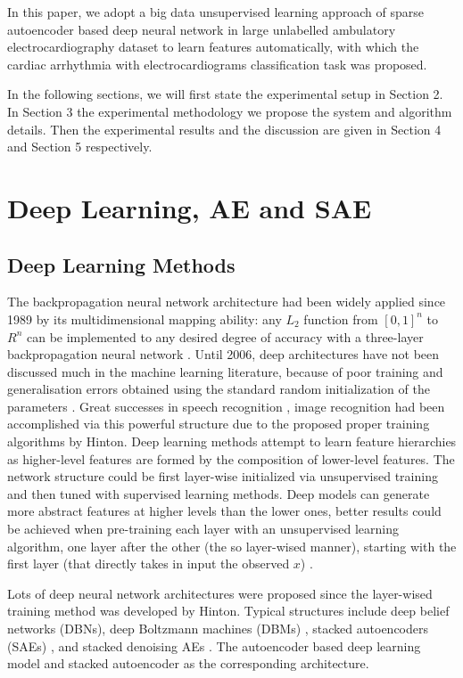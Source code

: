 \documentclass[journal]{IEEEtran}
\begin{document}
In this paper, we adopt a big data unsupervised learning approach of sparse autoencoder based deep neural network in large unlabelled ambulatory electrocardiography dataset to learn features automatically, with which the cardiac arrhythmia with electrocardiograms classification task was proposed. 

In the following sections, we will first state the experimental setup in Section 2. In Section 3 the experimental methodology we propose the system and algorithm details. Then the experimental results and the discussion are given in Section 4 and Section 5 respectively.

\section{Deep Learning, AE and SAE}
\subsection{Deep Learning Methods}
The backpropagation neural network architecture had been widely applied since 1989 by its multidimensional mapping ability: any $L_2$ function from $[0, 1]^n$ to $R^n$ can be implemented to any desired degree of accuracy with a three-layer backpropagation neural network \cite{hecht}. Until 2006, deep architectures have not been discussed much in the machine learning literature, because of poor training and generalisation errors obtained using the standard random initialization of the parameters \cite{bengio2009}. Great successes in speech recognition \cite{hinton2012deep}, image recognition\cite{ciresan2010deep} had been accomplished via this powerful structure due to the proposed proper training algorithms by Hinton\cite{hinton}. Deep learning methods attempt to learn feature hierarchies as higher-level features are formed by the composition of lower-level features. The network structure could be first layer-wise initialized via unsupervised training and then tuned with supervised learning methods. Deep models can generate more abstract features at higher levels than the lower ones,  better results could be achieved when pre-training each layer with an unsupervised learning algorithm, one layer after the other (the so layer-wised manner), starting with the first layer (that directly takes in input the observed $x$) \cite{bengio2009}.

Lots of deep neural network architectures were proposed since the layer-wised training method was developed by Hinton. Typical structures include deep belief networks (DBNs)\cite{hinton2006fast}, deep Boltzmann machines (DBMs) \cite{salakhutdinov2009deep}, stacked autoencoders (SAEs) \cite{bengio2007greedy}, and stacked denoising AEs \cite{vincent2010stacked}. The autoencoder based deep learning model and stacked autoencoder as the corresponding architecture.
 
\end{document}
